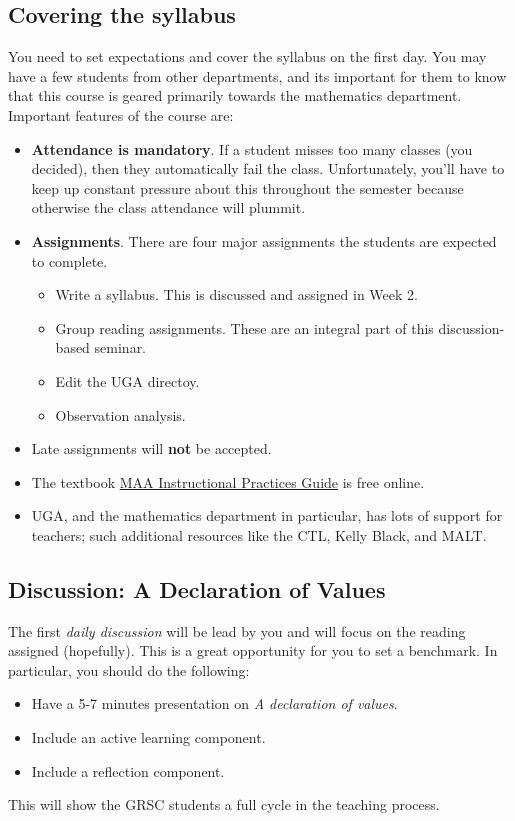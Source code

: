 \subsection{Covering the syllabus}
\label{sec:covering-syllabus}

You need to set expectations and cover the syllabus on the first day.  You may have a few students from other departments, and its important for them to know that this course is geared primarily towards the mathematics department.  Important features of the course are:

\begin{itemize}
\item \textbf{Attendance is mandatory}.  If a student misses too many classes (you decided), then they automatically fail the class.  Unfortunately, you'll have to keep up constant pressure about this throughout the semester because otherwise the class attendance will plummit.
\item \textbf{Assignments}.  There are four major assignments the students are expected to complete.
  \begin{itemize}
  \item Write a syllabus.  This is discussed and assigned in Week 2.
  \item Group reading assignments.  These are an integral part of this discussion-based seminar.
  \item Edit the UGA directoy.
  \item Observation analysis.
  \end{itemize}
\item Late assignments will \textbf{not} be accepted.
\item The textbook \href{https://www.maa.org/sites/default/files/InstructPracGuide_web.pdf}{MAA Instructional Practices Guide} is free online.
\item UGA, and the mathematics department in particular, has lots of support for teachers; such additional resources like the CTL, Kelly Black, and MALT.
\end{itemize}

\subsection{Discussion: A Declaration of Values}
\label{sec:disc-decl-valu-1}

The first \emph{daily discussion} will be lead by you and will focus on the reading assigned (hopefully).  This is a great opportunity for you to set a benchmark.  In particular, you should do the following:
\begin{itemize}
\item Have a 5-7 minutes presentation on \emph{A declaration of values}.
\item Include an active learning component.
\item Include a reflection component.
\end{itemize}

This will show the GRSC students a full cycle in the teaching process.


